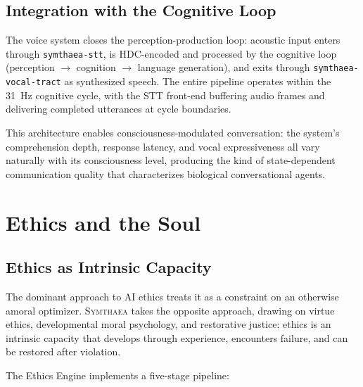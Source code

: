 \documentclass[12pt]{book}
\newcommand{\symthaea}{\textsc{Symthaea}}
\begin{document}
\section{Integration with the Cognitive Loop}

The voice system closes the perception-production loop: acoustic input enters through \texttt{symthaea-stt}, is HDC-encoded and processed by the cognitive loop (perception $\to$ cognition $\to$ language generation), and exits through \texttt{symthaea-vocal-tract} as synthesized speech. The entire pipeline operates within the 31~Hz cognitive cycle, with the STT front-end buffering audio frames and delivering completed utterances at cycle boundaries.

This architecture enables consciousness-modulated conversation: the system's comprehension depth, response latency, and vocal expressiveness all vary naturally with its consciousness level, producing the kind of state-dependent communication quality that characterizes biological conversational agents.


\chapter{Ethics and the Soul}
\label{ch:ethics}

\section{Ethics as Intrinsic Capacity}

The dominant approach to AI ethics treats it as a constraint on an otherwise amoral optimizer. \symthaea{} takes the opposite approach, drawing on virtue ethics, developmental moral psychology, and restorative justice: ethics is an intrinsic capacity that develops through experience, encounters failure, and can be restored after violation.

The Ethics Engine implements a five-stage pipeline:
\end{document}
